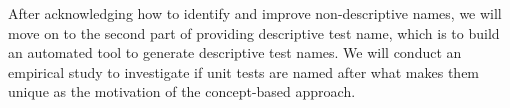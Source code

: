 



After acknowledging how to identify and improve non-descriptive names, we will move on to the second part of providing descriptive test name, which is to build an automated tool to generate descriptive test names.
%
We will conduct an empirical study to investigate if unit tests are named after what makes them unique as the motivation of the concept-based approach.
